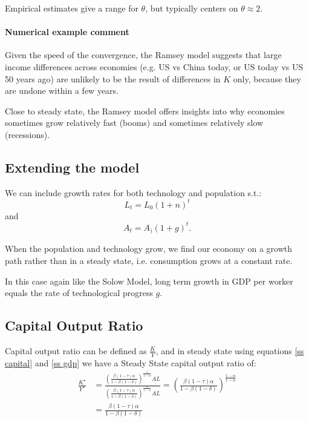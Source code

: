 \documentclass[11pt]{article}
\begin{document}
\begin{note}
    Empirical estimates give a range for $\theta$, but typically centers on $\theta\approx2$. 
\end{note}

\paragraph{Numerical example comment}

Given the speed of the convergence, the Ramsey model suggests that large income differences across economies (e.g. US vs China today, or US today vs US 50 years ago) are unlikely to be the result of differences in $K$ only, because they are undone within a few years.

Close to steady state, the Ramsey model offers insights into why economies sometimes grow relatively fast (booms) and sometimes relatively slow (recessions).

\subsection{Extending the model}

We can include growth rates for both technology and population s.t.:
\[L_t = L_0(1+n)^t\]
and 
\[A_t = A_)(1+g)^t.\]

When the population and technology grow, we find our economy on a growth path rather than in a steady state, i.e. consumption grows at a constant rate.

\begin{note}
    In this case again like the Solow Model, long term growth in GDP per worker equals the rate of technological progress $g$.
\end{note}

\subsection{Capital Output Ratio}

Capital output ratio can be defined as $\frac{K}{Y}$, and in steady state using equations \eqref{ss capital} and \eqref{ss gdp} we have a Steady State capital output ratio of:
\begin{equation}
\label{ss capital output ratio}
\begin{aligned}
\frac{K^{\star}}{Y^{\star}} & =\frac{\left(\frac{\beta(1-\tau) \alpha}{1-\beta(1-\delta)}\right)^{\frac{1}{1-\alpha}} A L}{\left(\frac{\beta(1-\tau) \alpha}{1-\beta(1-\delta)}\right)^{\frac{\alpha}{1-\alpha}} A L}=\left(\frac{\beta(1-\tau) \alpha}{1-\beta(1-\delta)}\right)^{\frac{1-\alpha}{1-\alpha}} \\
& =\frac{\beta(1-\tau) \alpha}{1-\beta(1-\delta)}
\end{aligned}
\end{equation}
\end{document}

